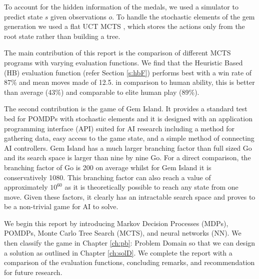 \documentclass{bhamthesis}
\theoremstyle{definition}
\begin{document}
To account for the hidden information of the medals, we used a simulator to predict state $s$ given observations $o$. To handle the stochastic elements of the gem generation we used a flat UCT MCTS \cite{Browne2012}, which stores the actions only from the root state rather than building a tree. 

The main contribution of this report is the comparison of different MCTS programs with varying evaluation functions. We find that the Heuristic Based (HB) evaluation function (refer Section \ref{s:hbF}) performs best with a win rate of 87\% and mean moves made of 12.5. in comparison to human ability, this is better than average (43\%) and comparable to elite human play (89\%).

The second contribution is the game of Gem Island. It provides a standard test bed for POMDPs with stochastic elements and it is designed with an application programming interface (API) suited for AI research including a method for gathering data, easy access to the game state, and a simple method of connecting AI controllers. Gem Island has a much larger branching factor than full sized Go and its search space is larger than nine by nine Go. For a direct comparison, the branching factor of Go is 200 on average \cite{Gelly2006} whilst for Gem Island it is conservatively 1080. This branching factor can also reach a value of approximately $10^{60}$ as it is theoretically possible to reach any state from one move. Given these factors, it clearly has an intractable search space and proves to be a non-trivial game for AI to solve.

We begin this report by introducing Markov Decision Processes (MDPs), POMDPs, Monte Carlo Tree Search (MCTS), and neural networks (NN). We then classify the game in Chapter \ref{ch:pb}: Problem Domain so that we can design a solution as outlined in Chapter \ref{ch:solD}. We complete the report with a comparison of the evaluation functions, concluding remarks, and recommendation for future research.
\end{document}
